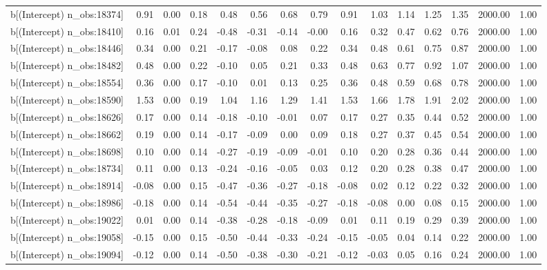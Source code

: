\begin{table}[ht]
\begin{tabular}{rrrrrrrrrrrrrrr}
  b[(Intercept) n\_obs:18374] & 0.91 & 0.00 & 0.18 & 0.48 & 0.56 & 0.68 & 0.79 & 0.91 & 1.03 & 1.14 & 1.25 & 1.35 & 2000.00 & 1.00 \\ 
  b[(Intercept) n\_obs:18410] & 0.16 & 0.01 & 0.24 & -0.48 & -0.31 & -0.14 & -0.00 & 0.16 & 0.32 & 0.47 & 0.62 & 0.76 & 2000.00 & 1.00 \\ 
  b[(Intercept) n\_obs:18446] & 0.34 & 0.00 & 0.21 & -0.17 & -0.08 & 0.08 & 0.22 & 0.34 & 0.48 & 0.61 & 0.75 & 0.87 & 2000.00 & 1.00 \\ 
  b[(Intercept) n\_obs:18482] & 0.48 & 0.00 & 0.22 & -0.10 & 0.05 & 0.21 & 0.33 & 0.48 & 0.63 & 0.77 & 0.92 & 1.07 & 2000.00 & 1.00 \\ 
  b[(Intercept) n\_obs:18554] & 0.36 & 0.00 & 0.17 & -0.10 & 0.01 & 0.13 & 0.25 & 0.36 & 0.48 & 0.59 & 0.68 & 0.78 & 2000.00 & 1.00 \\ 
  b[(Intercept) n\_obs:18590] & 1.53 & 0.00 & 0.19 & 1.04 & 1.16 & 1.29 & 1.41 & 1.53 & 1.66 & 1.78 & 1.91 & 2.02 & 2000.00 & 1.00 \\ 
  b[(Intercept) n\_obs:18626] & 0.17 & 0.00 & 0.14 & -0.18 & -0.10 & -0.01 & 0.07 & 0.17 & 0.27 & 0.35 & 0.44 & 0.52 & 2000.00 & 1.00 \\ 
  b[(Intercept) n\_obs:18662] & 0.19 & 0.00 & 0.14 & -0.17 & -0.09 & 0.00 & 0.09 & 0.18 & 0.27 & 0.37 & 0.45 & 0.54 & 2000.00 & 1.00 \\ 
  b[(Intercept) n\_obs:18698] & 0.10 & 0.00 & 0.14 & -0.27 & -0.19 & -0.09 & -0.01 & 0.10 & 0.20 & 0.28 & 0.36 & 0.44 & 2000.00 & 1.00 \\ 
  b[(Intercept) n\_obs:18734] & 0.11 & 0.00 & 0.13 & -0.24 & -0.16 & -0.05 & 0.03 & 0.12 & 0.20 & 0.28 & 0.38 & 0.47 & 2000.00 & 1.00 \\ 
  b[(Intercept) n\_obs:18914] & -0.08 & 0.00 & 0.15 & -0.47 & -0.36 & -0.27 & -0.18 & -0.08 & 0.02 & 0.12 & 0.22 & 0.32 & 2000.00 & 1.00 \\ 
  b[(Intercept) n\_obs:18986] & -0.18 & 0.00 & 0.14 & -0.54 & -0.44 & -0.35 & -0.27 & -0.18 & -0.08 & 0.00 & 0.08 & 0.15 & 2000.00 & 1.00 \\ 
  b[(Intercept) n\_obs:19022] & 0.01 & 0.00 & 0.14 & -0.38 & -0.28 & -0.18 & -0.09 & 0.01 & 0.11 & 0.19 & 0.29 & 0.39 & 2000.00 & 1.00 \\ 
  b[(Intercept) n\_obs:19058] & -0.15 & 0.00 & 0.15 & -0.50 & -0.44 & -0.33 & -0.24 & -0.15 & -0.05 & 0.04 & 0.14 & 0.22 & 2000.00 & 1.00 \\ 
  b[(Intercept) n\_obs:19094] & -0.12 & 0.00 & 0.14 & -0.50 & -0.38 & -0.30 & -0.21 & -0.12 & -0.03 & 0.05 & 0.16 & 0.24 & 2000.00 & 1.00 \\ 

\end{tabular}
\end{table}
